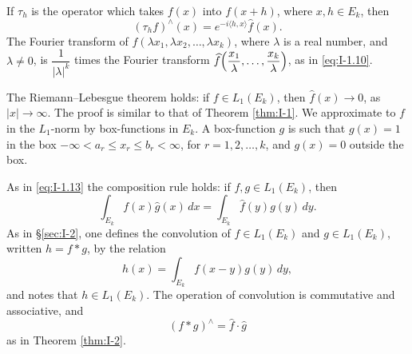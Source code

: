 If $\tau_h$ is the operator which takes $f(x)$ into $f(x+h)$, where $x,h\in E_k$, then
\begin{equation}\label{eq:I-15.3}\tag{15.3}
(\tau_hf)^{\wedge}(x)=e^{-i\langle h,x\rangle}\widehat f(x).
\end{equation}
The Fourier transform of $f(\lambda x_1,\lambda x_2,\ldots,\lambda x_k)$, where $\lambda$ is a real number, and $\lambda\neq 0$, is $\dfrac{1}{|\lambda|^k}$ times the Fourier transform $\widehat f\Bigl(\dfrac{x_1}{\lambda},\ldots,\dfrac{x_k}{\lambda}\Bigr)$, as in \eqref{eq:I-1.10}.

The Riemann--Lebesgue theorem holds: if $f\in L_1(E_k)$, then $\widehat f(x)\to 0$, as $|x|\to\infty$. The proof is similar to that of Theorem \ref{thm:I-1}. We approximate to $f$ in the $L_1$-norm by box-functions in $E_k$. A box-function $g$ is such that $g(x)=1$ in the box $-\infty<a_r\le x_r\le b_r<\infty$, for $r=1,2,\ldots,k$, and $g(x)=0$ outside the box.

As in \eqref{eq:I-1.13} the composition rule holds: if $f,g\in L_1(E_k)$, then
\begin{equation}\label{eq:I-15.4}\tag{15.4}
\int_{E_k}f(x)\widehat g(x)\,dx=\int_{E_k}\widehat f(y)g(y)\,dy.
\end{equation}
As in \S\ref{sec:I-2}, one defines the convolution of $f\in L_1(E_k)$ and $g\in L_1(E_k)$, written $h=f*g$, by the relation
\begin{equation}\label{eq:I-15.5}\tag{15.5}
h(x)=\int_{E_k}f(x-y)g(y)\,dy,
\end{equation}
and notes that $h\in L_1(E_k)$. The operation of convolution is commutative and associative, and
\begin{equation}\label{eq:I-15.6}\tag{15.6}
(f*g)^{\wedge}=\widehat f\cdot\widehat g
\end{equation}
as in Theorem \ref{thm:I-2}.

